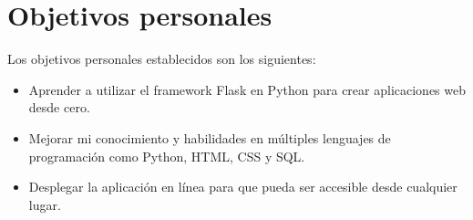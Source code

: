 \section{Objetivos personales}
Los objetivos personales establecidos son los siguientes:
\begin{itemize}
    \item Aprender a utilizar el framework Flask en Python para crear aplicaciones web desde cero.
    \item Mejorar mi conocimiento y habilidades en múltiples lenguajes de programación como Python, HTML, CSS y SQL.
    \item Desplegar la aplicación en línea para que pueda ser accesible desde cualquier lugar.
\end{itemize}